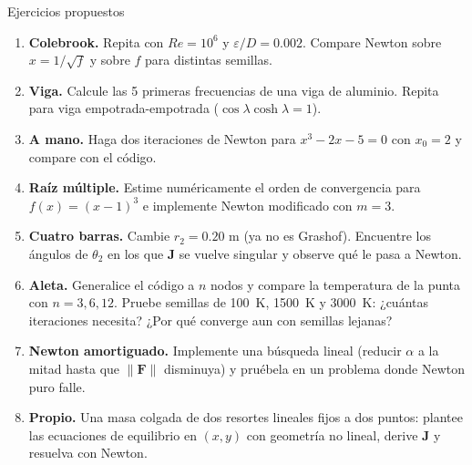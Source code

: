 \documentclass[aspectratio=169,11pt]{beamer}
\newcommand{\vect}[1]{\mathbf{#1}}
\newcommand{\Jac}{\mathbf{J}}
\begin{document}
\begin{frame}{Ejercicios propuestos}
  \footnotesize
  \setlength{\itemsep}{1pt}
  \begin{enumerate}
    \item \textbf{Colebrook.} Repita con $Re=10^6$ y $\varepsilon/D=0.002$. Compare Newton sobre $x=1/\sqrt f$ y sobre $f$ para distintas semillas.
    \item \textbf{Viga.} Calcule las 5 primeras frecuencias de una viga de aluminio. Repita para viga empotrada-empotrada ($\cos\lambda\cosh\lambda=1$).
    \item \textbf{A mano.} Haga dos iteraciones de Newton para $x^3-2x-5=0$ con $x_0=2$ y compare con el código.
    \item \textbf{Raíz múltiple.} Estime numéricamente el orden de convergencia para $f(x)=(x-1)^3$ e implemente Newton modificado con $m=3$.
    \item \textbf{Cuatro barras.} Cambie $r_2=0.20$ m (ya no es Grashof). Encuentre los ángulos de $\theta_2$ en los que $\Jac$ se vuelve singular y observe qué le pasa a Newton.
    \item \textbf{Aleta.} Generalice el código a $n$ nodos y compare la temperatura de la punta con $n=3,6,12$. Pruebe semillas de 100~K, 1500~K y 3000~K: ¿cuántas iteraciones necesita? ¿Por qué converge aun con semillas lejanas?
    \item \textbf{Newton amortiguado.} Implemente una búsqueda lineal (reducir $\alpha$ a la mitad hasta que $\|\vect F\|$ disminuya) y pruébela en un problema donde Newton puro falle.
    \item \textbf{Propio.} Una masa colgada de dos resortes lineales fijos a dos puntos: plantee las ecuaciones de equilibrio en $(x,y)$ con geometría no lineal, derive $\Jac$ y resuelva con Newton.
  \end{enumerate}
\end{frame}
\end{document}
